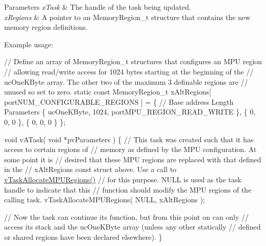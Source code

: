 \begin{DoxyParams}{Parameters}
{\em x\+Task} & The handle of the task being updated.\\
\hline
{\em x\+Regions} & A pointer to an Memory\+Region\+\_\+t structure that contains the new memory region definitions.\\
\hline
\end{DoxyParams}
Example usage\+: 
\begin{DoxyPre}
// Define an array of MemoryRegion\_t structures that configures an MPU region
// allowing read/write access for 1024 bytes starting at the beginning of the
// ucOneKByte array.  The other two of the maximum 3 definable regions are
// unused so set to zero.
static const MemoryRegion\_t xAltRegions[ portNUM\_CONFIGURABLE\_REGIONS ] =
\{
    // Base address     Length      Parameters
    \{ ucOneKByte,       1024,       portMPU\_REGION\_READ\_WRITE \},
    \{ 0,                0,          0 \},
    \{ 0,                0,          0 \}
\};\end{DoxyPre}



\begin{DoxyPre}void vATask( void *pvParameters )
\{
    // This task was created such that it has access to certain regions of
    // memory as defined by the MPU configuration.  At some point it is
    // desired that these MPU regions are replaced with that defined in the
    // xAltRegions const struct above.  Use a call to \hyperlink{task_8h_ad889595baff9faf9efe02f3696825409}{vTaskAllocateMPURegions()}
    // for this purpose.  NULL is used as the task handle to indicate that this
    // function should modify the MPU regions of the calling task.
    vTaskAllocateMPURegions( NULL, xAltRegions );\end{DoxyPre}



\begin{DoxyPre}    // Now the task can continue its function, but from this point on can only
    // access its stack and the ucOneKByte array (unless any other statically
    // defined or shared regions have been declared elsewhere).
\}
   \end{DoxyPre}
 